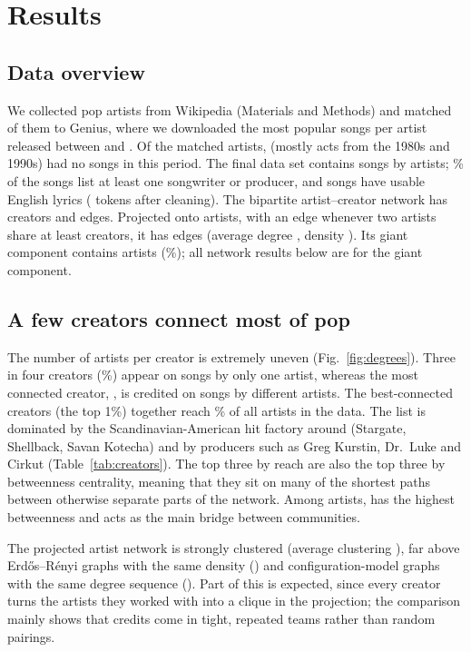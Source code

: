\documentclass[9pt,twocolumn,twoside]{pnas-new}
\begin{document}
\section*{Results}

\subsection*{Data overview}
We collected \WikiArtists{} pop artists from Wikipedia (Materials and Methods) and matched \NumGeniusMatched{} of them to Genius, where we downloaded the \SongsPerArtist{} most popular songs per artist released between \YearMin{} and \YearMax{}. Of the matched artists, \NumNoSongs{} (mostly acts from the 1980s and 1990s) had no songs in this period. The final data set contains \NumSongs{} songs by \NumArtists{} artists; \PctSongsCredits\% of the songs list at least one songwriter or producer, and \NumSongsLyrics{} songs have usable English lyrics (\NumTokens{} tokens after cleaning). The bipartite artist--creator network has \NumCreators{} creators and \NumBipEdges{} edges. Projected onto artists, with an edge whenever two artists share at least \MinEdgeWeight{} creators, it has \NumEdges{} edges (average degree \AvgDegree, density \Density). Its giant component contains \GiantSize{} artists (\GiantPct\%); all network results below are for the giant component.

\subsection*{A few creators connect most of pop}
The number of artists per creator is extremely uneven (Fig.~\ref{fig:degrees}). Three in four creators (\PctOneArtistCreators\%) appear on songs by only one artist, whereas the most connected creator, \TopCreator, is credited on songs by \TopCreatorArtists{} different artists. The \NumTopOnePct{} best-connected creators (the top 1\%) together reach \PctReachedTopOne\% of all artists in the data. The list is dominated by the Scandinavian-American hit factory around \TopCreator{} (Stargate, Shellback, Savan Kotecha) and by producers such as Greg Kurstin, Dr.\ Luke and Cirkut (Table~\ref{tab:creators}). The top three by reach are also the top three by betweenness centrality, meaning that they sit on many of the shortest paths between otherwise separate parts of the network. Among artists, \BridgeArtist{} has the highest betweenness and acts as the main bridge between communities.

The projected artist network is strongly clustered (average clustering \Clust), far above Erd\H{o}s--R\'enyi graphs with the same density (\ClustER) and configuration-model graphs with the same degree sequence (\ClustConfig). Part of this is expected, since every creator turns the artists they worked with into a clique in the projection; the comparison mainly shows that credits come in tight, repeated teams rather than random pairings.
\end{document}
